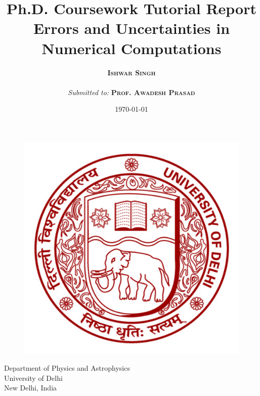 \documentclass[a4,12pt]{article}
\numberwithin{equation}{subsection}
\begin{document}
\begin{titlepage}
    \begin{center}
        \title{\textbf{Ph.D. Coursework Tutorial Report} \\ Errors and Uncertainties in Numerical Computations}
        \vspace{1.5cm}
		\author{\textsc{\textbf{Ishwar Singh}}\\ \\ \textit{ Submitted to:} \textsc{\textbf{Prof. Awadesh Prasad}}}
		\vspace{0.7cm}
		\date{\today}
		\maketitle
		\thispagestyle{empty}
				\begin{figure}[H]
				\begin{center}
        \includegraphics[scale=0.4]{University_of_delhi_logo.png}
				\end{center}
				\end{figure}
       	\vspace{0.8cm}
       	\begin{center}
        Department of Physics and Astrophysics\\
        University of Delhi\\
        New Delhi, India\\
				\end{center}


    \end{center}
\end{titlepage}
\printnomenclature[3em]
\tableofcontents
\thispagestyle{empty}
\listoffigures
\thispagestyle{empty}
\newpage
\clearpage
\pagebreak
\setcounter{page}{1}
\end{document}

